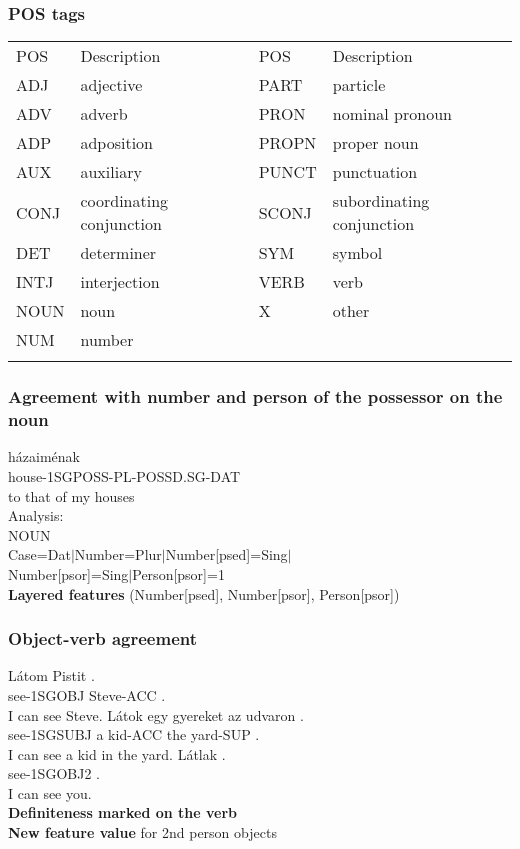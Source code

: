 \documentclass{beamer}
\begin{document}
\begin{frame}
\frametitle{POS tags}
\begin{table}
\small
\begin{tabular}{llll}
\hline\noalign{\smallskip}
POS & Description & POS & Description \\
\noalign{\smallskip}\hline\noalign{\smallskip}
ADJ & adjective & PART & particle\\
ADV & adverb & PRON & nominal pronoun\\
ADP & adposition & PROPN & proper noun\\
AUX & auxiliary & PUNCT & punctuation\\
CONJ & coordinating conjunction & SCONJ & subordinating conjunction\\
DET & determiner & SYM & symbol\\
INTJ & interjection & VERB & verb\\
NOUN & noun & X & other\\
NUM & number & & \\
\noalign{\smallskip}\hline
\end{tabular}
\end{table}
\end{frame}

\begin{frame}
\frametitle{Agreement with number and person of the possessor on the noun}
\gll h\'azaim\'enak\\
house-1SGPOSS-PL-POSSD.SG-DAT\\
\trans to that of my houses\\
Analysis:\\
NOUN \\ Case=Dat$\vert$Number=Plur$\vert$Number[psed]=Sing$\vert$\\Number[psor]=Sing$\vert$Person[psor]=1\\

\textbf{Layered features} (Number[psed], Number[psor], Person[psor])
\end{frame}

\begin{frame}
\frametitle{Object-verb agreement}
\gll L\'atom Pistit .\\
see-1SGOBJ Steve-ACC .\\
\trans I can see Steve.
\gll L\'atok egy gyereket az udvaron .\\
see-1SGSUBJ a kid-ACC the yard-SUP .\\
\trans I can see a kid in the yard.
\gll L\'atlak .\\
see-1SGOBJ2 .\\
\trans I can see you.\\
\textbf{Definiteness marked on the verb}\\
\textbf{New feature value} for 2nd person objects
\end{frame}
\end{document}
